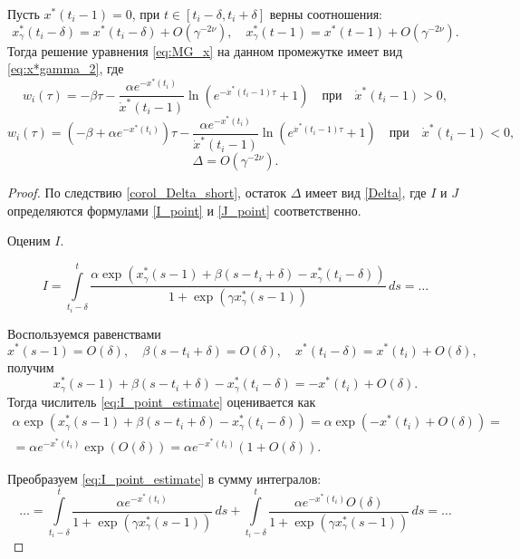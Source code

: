 \begin{lemma}
\label{lm:w}
	Пусть $x^*(t_i - 1) = 0$, при $t \in [t_i - \delta, t_i + \delta]$ верны соотношения:
	\[ x^*_{\gamma}(t_i - \delta) = x^*(t_i - \delta) + O(\gamma^{-2\nu}), \quad x^*_{\gamma}(t - 1) = x^*(t - 1) + O(\gamma^{-2\nu}).\]
	Тогда решение уравнения \eqref{eq:MG_x} на данном промежутке имеет вид \eqref{eq:x*gamma_2}, где
	\[
	w_i(\tau) = -\beta \tau - \dfrac{\alpha e^{-x^*(t_i)}}{\dot{x}^*(t_i - 1)} \ln\left(e^{-\dot{x}^*(t_i - 1)\tau} + 1\right) \quad \text{при} \quad \dot{x}^*(t_i - 1) > 0,
	\]
	\[
	w_i(\tau) = (-\beta + \alpha e^{-x^*(t_i)})\tau - \dfrac{\alpha e^{-x^*(t_i)}}{\dot{x}^*(t_i - 1)} \ln\left(e^{\dot{x}^*(t_i - 1)\tau} + 1\right) \quad \text{при} \quad \dot{x}^*(t_i - 1) < 0,
	\]
	\[
	\Delta = O(\gamma^{-2\nu}).
	\]
\end{lemma}
%
\begin{proof}
	По следствию \ref{corol_Delta_short}, остаток $\Delta$ имеет вид \eqref{Delta}, где $I$ и $J$ определяются формулами \eqref{I_point} и \eqref{J_point} соответственно.
	
	Оценим $I$.
	
	\begin{equation}
	\label{eq:I_point_estimate}
	I = \int\limits_{t_i - \delta}^{t} \dfrac{\alpha \exp(x^*_{\gamma}(s - 1) + \beta(s - t_i + \delta) - x^*_{\gamma}(t_i - \delta))}{1 + \exp(\gamma x^*_{\gamma}(s - 1))}\, ds = \ldots
	\end{equation}
	
	Воспользуемся равенствами
	\[
	x^*(s - 1) = O(\delta), \quad \beta(s - t_i + \delta) = O(\delta), \quad x^*(t_i - \delta) = x^*(t_i) + O(\delta),
	\]
	получим
	\[
	x^*_{\gamma}(s - 1) + \beta(s - t_i + \delta) - x^*_{\gamma}(t_i - \delta) = -x^*(t_i) + O(\delta).
	\]
	Тогда числитель \eqref{eq:I_point_estimate} оценивается как
	\begin{multline*}
	\alpha \exp(x^*_{\gamma}(s - 1) + \beta(s - t_i + \delta) - x^*_{\gamma}(t_i - \delta)) = \alpha \exp(-x^*(t_i) + O(\delta)) =\\= \alpha e^{-x^*(t_i)} \exp(O(\delta)) = \alpha e^{-x^*(t_i)} (1 + O(\delta)).
	\end{multline*}
	
	Преобразуем \eqref{eq:I_point_estimate} в сумму интегралов:
	\[
	\ldots = \int\limits_{t_i - \delta}^{t} \dfrac{\alpha e^{-x^*(t_i)}}{1 + \exp(\gamma x^*_{\gamma}(s - 1))}\, ds + \int\limits_{t_i - \delta}^{t} \dfrac{\alpha e^{-x^*(t_i)} O(\delta)}{1 + \exp(\gamma x^*_{\gamma}(s - 1))} \, ds = \ldots
	\]
	

\end{proof}
